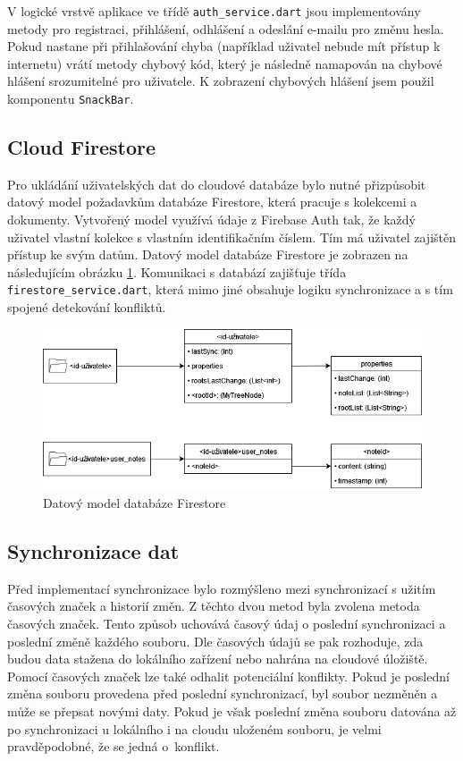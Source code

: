\documentclass[czech, bc, kiv, he, iso690numb]{fasthesis}
\begin{document}
V logické vrstvě aplikace ve třídě \texttt{auth\_service.dart} jsou implementovány metody pro registraci, přihlášení, odhlášení a odeslání e-mailu pro změnu hesla. Pokud nastane při přihlašování chyba (například uživatel nebude mít přístup k internetu) vrátí metody chybový kód, který je následně namapován na chybové hlášení srozumitelné pro uživatele. K zobrazení chybových hlášení jsem použil komponentu \texttt{SnackBar}.  

\subsection{Cloud Firestore}

Pro ukládání uživatelských dat do cloudové databáze bylo nutné přizpůsobit datový model požadavkům databáze Firestore, která pracuje s kolekcemi a dokumenty. Vytvořený model využívá údaje z Firebase Auth tak, že každý uživatel vlastní kolekce s vlastním identifikačním číslem. Tím má uživatel zajištěn přístup ke svým datům. Datový model databáze Firestore je zobrazen na následujícím obrázku \ref{fig:firestore-data-model}. Komunikaci s databází zajišťuje třída \texttt{firestore\_service.dart}, která mimo jiné obsahuje logiku synchronizace a s tím spojené detekování konfliktů.

\begin{figure}[h]
  \centering
  \includegraphics[width=1\textwidth]{img/BP-Runt/Planning/Firebase-data-model.png}
  \caption{Datový model databáze Firestore}
  \label{fig:firestore-data-model}
\end{figure}

\newpage

\subsection{Synchronizace dat}

Před implementací synchronizace bylo rozmýšleno mezi synchronizací s užitím časových značek a historií změn. Z těchto dvou metod byla zvolena metoda časových značek. Tento způsob uchovává časový údaj o poslední synchronizaci a poslední změně každého souboru. Dle časových údajů se pak rozhoduje, zda budou data stažena do lokálního zařízení nebo nahrána na cloudové úložiště. Pomocí časových značek lze také odhalit potenciální konflikty. Pokud je poslední změna souboru provedena před poslední synchronizací, byl soubor nezměněn a může se přepsat novými daty. Pokud je však poslední změna souboru datována až po synchronizaci u lokálního i na cloudu uloženém souboru, je velmi pravděpodobné, že se jedná o~konflikt. 
\end{document}
